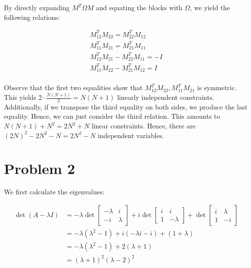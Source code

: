 \documentclass[12pt]{article}%
\begin{document}
\begin{enumerate}
\begin{enumerate}
    By directly expanding $M^T\Omega M $ and equating the blocks with $\Omega$, we yield the following relations:

    \begin{align*}
        M_{12}^T M_{22} = M^T_{22}M_{12} \\
        M^T_{11}M_{21} = M^T_{21}M_{11} \\
        M^T_{12} M_{21} - M_{22}^TM_{11} = -I \\
        M^T_{11} M_{22} - M_{21}^TM_{12} = I \\
    \end{align*}

    Observe that the first two equalities show that $  M_{12}^T M_{22}, M^T_{11}M_{21}$ is symmetric. This yields $2\cdot \frac{N(N+1)}{2} = N(N+1)$ linearly independent constraints. Additionally, if we transpose the third equality on both sides, we produce the last equality. Hence, we can just consider the third relation. This amounts to $N(N+1) + N^2 = 2N^2 + N$ linear constraints. Hence, there are $(2N)^2 - 2N^2 - N = 2N^2 - N$ independent variables.
  \end{enumerate}
\end{enumerate}

\section{Problem 2}
We first calculate the eigenvalues:

\begin{align*}
  \det(A - \lambda I) & =  -\lambda \det \begin{bmatrix}
                                      - \lambda & i \\
                                      -i & \lambda
                                      \end{bmatrix}
                                    + i \det \begin{bmatrix}
                                         i & i \\
                                         1 & -\lambda
                                            \end{bmatrix}
                                    + \det \begin{bmatrix}
                                         i & \lambda \\
                                         1 & -i
                                        \end{bmatrix} \\
  & = -\lambda(\lambda^2 -1) + i(-\lambda i - i) + (1 + \lambda) \\
  & = -\lambda(\lambda^2 - 1) + 2(\lambda + 1) \\
  & = (\lambda + 1)^2(\lambda - 2)^2
\end{align*}
\end{document}
